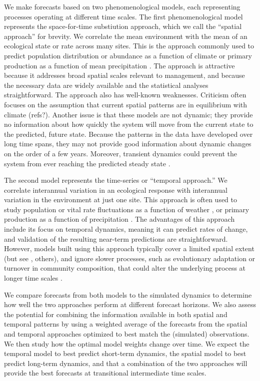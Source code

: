 \documentclass[11pt]{article}
\begin{document}
We make forecasts based on two phenomenological models, each representing processes operating at different time scales. 
The first phenomenological model represents the space-for-time substiution approach, which we call the ``spatial approach'' for brevity. 
We correlate the mean environment with the mean of an ecological state or rate across many sites. 
This is the approach commonly used to predict population distribution or abundance as a function of climate \citep{elith_species_2009} 
or primary production as a function of mean precipitation \citep{Sala1988}. The approach is attractive because it addresses broad spatial scales relevant to  management, and because the necessary data are widely available and the statistical analyses straightforward. The approach also has well-known weaknesses. Criticism often focuses on the assumption that current spatial patterns are in equilibrium with climate (refs?). Another issue is that these models are not dynamic;  they provide no information about how quickly the system will move from the current state to the predicted, future state. Because the patterns in the data have developed  over long time spans, they may not provide good information about dynamic changes on the order of a few years. Moreover, transient dynamics could prevent the system from ever reaching the predicted steady state \citep{Urban2012}. 

The second model represents the time-series or ``temporal approach.'' We correlate interannual variation in an ecological response with interannual variation in the environment at just one site. This approach is often used to study population or vital rate fluctuations as a function of weather \citep{dalgleish_climate_2011}, or primary production as a function of precipitation \citep{lauenroth_long-term_1992}. The advantages of this approach include its focus on temporal dynamics, meaning it can predict rates of change, and validation of the resulting near-term predictions are straightforward. However, models built using this approach typically cover a limited spatial extent (but see \citealt{kleinhesselink_response_2018}, others), and ignore slower processes, such as evolutionary adaptation or turnover in community composition, that could alter the underlying process at longer time scales \citep{clark_ecological_2001}.

We compare forecasts from both models to the simulated dynamics to determine how well the two approaches perform at different forecast horizons. We also assess the potential for combining the information available in both spatial and temporal patterns by using a weighted average of the forecasts from the spatial and temporal approaches optimized to best match the (simulated) observations. We then study how the optimal model weights change over time. We expect the temporal model to best predict short-term dynamics, the spatial model to best predict long-term dynamics, and that a combination of the two approaches will provide the best forecasts at transitional intermediate time scales.
\end{document}
